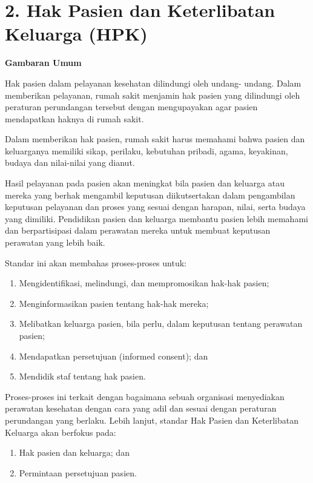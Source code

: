 \documentclass[
]{book}
\providecommand{\tightlist}{%
  \setlength{\itemsep}{0pt}\setlength{\parskip}{0pt}}
\begin{document}
\hypertarget{hak-pasien-dan-keterlibatan-keluarga-hpk}{%
\section*{2. Hak Pasien dan Keterlibatan Keluarga (HPK)}\label{hak-pasien-dan-keterlibatan-keluarga-hpk}}

\textbf{Gambaran Umum}

Hak pasien dalam pelayanan kesehatan dilindungi oleh undang- undang. Dalam memberikan pelayanan, rumah sakit menjamin hak pasien yang dilindungi oleh peraturan perundangan tersebut dengan mengupayakan agar pasien mendapatkan haknya di rumah sakit.

Dalam memberikan hak pasien, rumah sakit harus memahami bahwa pasien dan keluarganya memiliki sikap, perilaku, kebutuhan pribadi, agama, keyakinan, budaya dan nilai-nilai yang dianut.

Hasil pelayanan pada pasien akan meningkat bila pasien dan keluarga atau mereka yang berhak mengambil keputusan diikutsertakan dalam pengambilan keputusan pelayanan dan proses yang sesuai dengan harapan, nilai, serta budaya yang dimiliki. Pendidikan pasien dan keluarga membantu pasien lebih memahami dan berpartisipasi dalam perawatan mereka untuk membuat keputusan perawatan yang lebih baik.

Standar ini akan membahas proses-proses untuk:

\begin{enumerate}
\def\labelenumi{\alph{enumi}.}
\tightlist
\item
  Mengidentifikasi, melindungi, dan mempromosikan hak-hak pasien;
\item
  Menginformasikan pasien tentang hak-hak mereka;
\item
  Melibatkan keluarga pasien, bila perlu, dalam keputusan tentang perawatan pasien;
\item
  Mendapatkan persetujuan (informed consent); dan
\item
  Mendidik staf tentang hak pasien.
\end{enumerate}

Proses-proses ini terkait dengan bagaimana sebuah organisasi menyediakan perawatan kesehatan dengan cara yang adil dan sesuai dengan peraturan perundangan yang berlaku.
Lebih lanjut, standar Hak Pasien dan Keterlibatan Keluarga akan berfokus pada:

\begin{enumerate}
\def\labelenumi{\alph{enumi}.}
\tightlist
\item
  Hak pasien dan keluarga; dan
\item
  Permintaan persetujuan pasien.
\end{enumerate}
\end{document}
